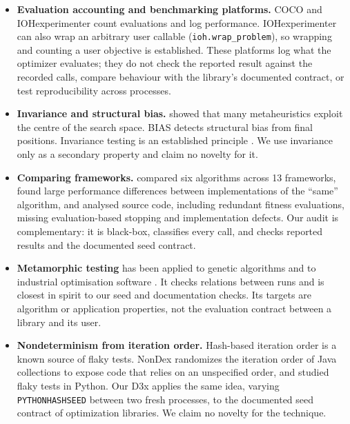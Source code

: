 \documentclass[acmsmall,screen,review,anonymous=false]{acmart}
\begin{document}
\begin{itemize}
\item
  \textbf{Evaluation accounting and benchmarking platforms.} COCO \citep{Hansen_2020} and IOHexperimenter \citep{de_Nobel_2024} count evaluations and log performance. IOHexperimenter can also wrap an arbitrary user callable
  (\texttt{ioh.\allowbreak{}wrap\_\allowbreak{}problem}), so wrapping and counting a user objective is established. These platforms log what the
  optimizer evaluates; they do not check the reported result against the recorded calls, compare behaviour with the
  library's documented contract, or test reproducibility across processes.
\item
  \textbf{Invariance and structural bias.} \citet{Kudela_2022} showed that many metaheuristics exploit the centre of the search
  space. BIAS \citep{Vermetten_2022} detects structural bias from final positions. Invariance testing is an
  established principle \citep{Hansen_2011}. We use invariance only as a secondary property and claim no novelty
  for it.
\item
  \textbf{Comparing frameworks.} \citet{Ravber_2025} compared six algorithms across 13 frameworks, found large
  performance differences between implementations of the ``same'' algorithm, and analysed source code, including
  redundant fitness evaluations, missing evaluation-based stopping and implementation defects. Our audit is
  complementary: it is black-box, classifies every call, and checks reported results and the documented seed contract.
\item
  \textbf{Metamorphic testing} has been applied to genetic algorithms \citep{Rounds2018} and to industrial
  optimisation software \citep{Duque_Torres_2025a,Duque_Torres_2025b}. It checks relations between runs and is closest in
  spirit to our seed and documentation checks. Its targets are algorithm or application properties, not the
  evaluation contract between a library and its user.
\item
  \textbf{Nondeterminism from iteration order.} Hash-based iteration order is a known source of flaky tests. NonDex
  \citep{Gyori_2016} randomizes the iteration order of Java collections to expose code that relies on an
  unspecified order, and \citet{Gruber_2021} studied flaky tests in Python. Our D3x applies the same idea, varying
  \texttt{PYTHONHASHSEED} between two fresh processes, to the documented seed contract of optimization libraries. We claim
  no novelty for the technique.
\end{itemize}
\end{document}
